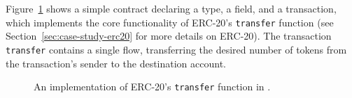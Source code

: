\documentclass[dvipsnames, usenames, sigconf]{acmart}
\begin{document}
Figure~\ref{fig:erc20-transfer-flow} shows a simple contract declaring a type, a field, and a transaction, which implements the core functionality of ERC-20's \lstinline{transfer} function (see Section~\ref{sec:case-study-erc20} for more details on ERC-20).
The transaction \lstinline{transfer} contains a single flow, transferring the desired number of tokens from the transaction's sender to the destination account.
\begin{figure}[h]
    \centering
    
    \caption{An implementation of ERC-20's \lstinline{transfer} function in \langName.}
    \label{fig:erc20-transfer-flow}
\end{figure}
%         
%         
\end{document}
